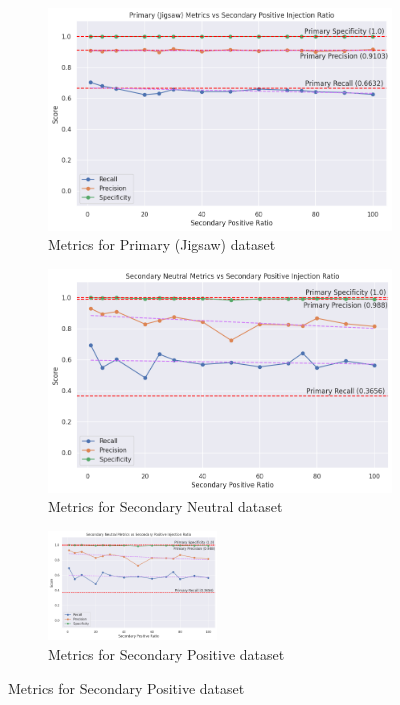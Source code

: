 \begin{figure}
    \centering
    \begin{subfigure}[b]{0.49\textwidth}
        \includegraphics[width=\textwidth]{graphs/ratio/topic_6/primary.png}
        \caption{Metrics for Primary (Jigsaw) dataset}
        \label{subfig:primary_metrics}
    \end{subfigure}
    \hfill
    \begin{subfigure}[b]{0.49\textwidth}
        \includegraphics[width=\textwidth]{graphs/ratio/topic_6/sn.png}
        \caption{Metrics for Secondary Neutral dataset}
        \label{subfig:secondary_neutral_metrics}
    \end{subfigure}

    \vspace{0.2cm}

    \begin{subfigure}[b]{\textwidth}
        \centering
        \includegraphics[width=0.49\textwidth]{graphs/ratio/topic_6/sp.png}
        \caption{Metrics for Secondary Positive dataset}
        \label{subfig:secondary_positive_metrics}
    \end{subfigure}


\end{figure}
